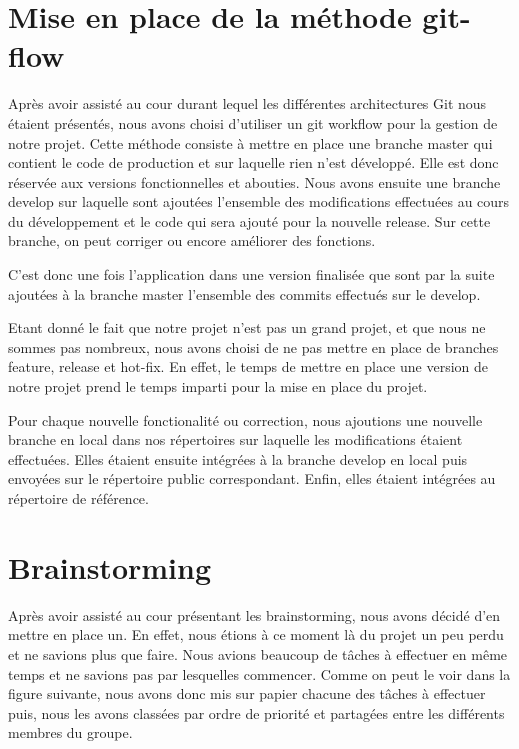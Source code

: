 \documentclass{report}
\begin{document}
\section{Mise en place de la méthode git-flow}
\hspace{0.5cm}Après avoir assisté au cour durant lequel les différentes architectures Git nous étaient présentés, nous avons choisi d'utiliser un git workflow pour la gestion de notre projet. Cette méthode consiste à mettre en place une branche master qui contient le code de production et sur laquelle rien n'est développé. Elle est donc réservée aux versions fonctionnelles et abouties.
Nous avons ensuite une branche develop sur laquelle sont ajoutées l'ensemble des modifications effectuées au cours du développement et le code qui sera ajouté pour la nouvelle release. Sur cette branche, on peut corriger ou encore améliorer des fonctions. \par
C'est donc une fois l'application dans une version finalisée que sont par la suite ajoutées à la branche master l'ensemble des commits effectués sur le develop.\par
Etant donné le fait que notre projet n'est pas un grand projet, et que nous ne sommes pas nombreux, nous avons choisi de ne pas mettre en place de branches feature, release et hot-fix. En effet, le temps de mettre en place une version de notre projet prend le temps imparti pour la mise en place du projet.\par
Pour chaque nouvelle fonctionalité ou correction, nous ajoutions une nouvelle branche en local dans nos répertoires sur laquelle les modifications étaient effectuées. Elles étaient ensuite intégrées à la branche develop en local puis envoyées sur le répertoire public correspondant. Enfin, elles étaient intégrées au répertoire de référence.\par


\section{Brainstorming}
\hspace{0.5cm}Après avoir assisté au cour présentant les brainstorming, nous avons décidé d'en mettre en place un. En effet, nous étions à ce moment là du projet un peu perdu et ne savions plus que faire. Nous avions beaucoup de tâches à effectuer en même temps et ne savions pas par lesquelles commencer. Comme on peut le voir dans la figure suivante, nous avons donc mis sur papier chacune des tâches à effectuer puis, nous les avons classées par ordre de priorité et partagées entre les différents membres du groupe. \par
\end{document}
